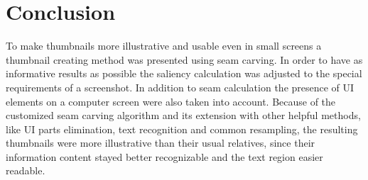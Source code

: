 \documentclass[draft,final]{vutinfth} %
\begin{document}
\chapter{Conclusion}
To make thumbnails more illustrative and usable even in small screens a thumbnail creating method was presented using seam carving.
In order to have as informative results as possible the saliency calculation was adjusted to the special requirements of a screenshot.
In addition to seam calculation the presence of UI elements on a computer screen were also taken into account.
Because of the customized seam carving algorithm and its extension with other helpful methods, like UI parts elimination, text recognition and common resampling, the resulting thumbnails were more illustrative than their usual relatives, since their information content stayed better recognizable and the text region easier readable. 
 

\backmatter

\listoffigures %

\cleardoublepage %
\listoftables %

\listofalgorithms
{}

\printindex

\printglossaries



\end{document}
